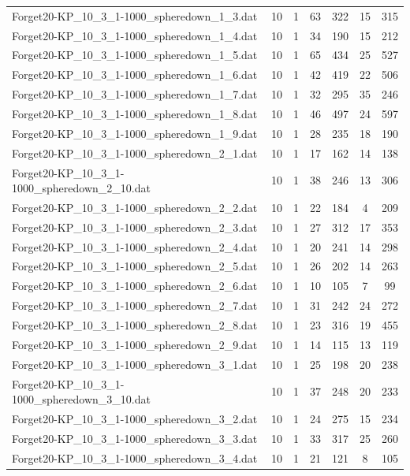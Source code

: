 \begin{table}[!ht]
\begin{tabular}{lcccccc}
Forget20-KP\_10\_3\_1-1000\_spheredown\_1\_3.dat & 10 & 1 & 63 & 322 & 15 & 315 \\
Forget20-KP\_10\_3\_1-1000\_spheredown\_1\_4.dat & 10 & 1 & 34 & 190 & 15 & 212 \\
Forget20-KP\_10\_3\_1-1000\_spheredown\_1\_5.dat & 10 & 1 & 65 & 434 & 25 & 527 \\
Forget20-KP\_10\_3\_1-1000\_spheredown\_1\_6.dat & 10 & 1 & 42 & 419 & 22 & 506 \\
Forget20-KP\_10\_3\_1-1000\_spheredown\_1\_7.dat & 10 & 1 & 32 & 295 & 35 & 246 \\
Forget20-KP\_10\_3\_1-1000\_spheredown\_1\_8.dat & 10 & 1 & 46 & 497 & 24 & 597 \\
Forget20-KP\_10\_3\_1-1000\_spheredown\_1\_9.dat & 10 & 1 & 28 & 235 & 18 & 190 \\
Forget20-KP\_10\_3\_1-1000\_spheredown\_2\_1.dat & 10 & 1 & 17 & 162 & 14 & 138 \\
Forget20-KP\_10\_3\_1-1000\_spheredown\_2\_10.dat & 10 & 1 & 38 & 246 & 13 & 306 \\
Forget20-KP\_10\_3\_1-1000\_spheredown\_2\_2.dat & 10 & 1 & 22 & 184 & 4 & 209 \\
Forget20-KP\_10\_3\_1-1000\_spheredown\_2\_3.dat & 10 & 1 & 27 & 312 & 17 & 353 \\
Forget20-KP\_10\_3\_1-1000\_spheredown\_2\_4.dat & 10 & 1 & 20 & 241 & 14 & 298 \\
Forget20-KP\_10\_3\_1-1000\_spheredown\_2\_5.dat & 10 & 1 & 26 & 202 & 14 & 263 \\
Forget20-KP\_10\_3\_1-1000\_spheredown\_2\_6.dat & 10 & 1 & 10 & 105 & 7 & 99 \\
Forget20-KP\_10\_3\_1-1000\_spheredown\_2\_7.dat & 10 & 1 & 31 & 242 & 24 & 272 \\
Forget20-KP\_10\_3\_1-1000\_spheredown\_2\_8.dat & 10 & 1 & 23 & 316 & 19 & 455 \\
Forget20-KP\_10\_3\_1-1000\_spheredown\_2\_9.dat & 10 & 1 & 14 & 115 & 13 & 119 \\
Forget20-KP\_10\_3\_1-1000\_spheredown\_3\_1.dat & 10 & 1 & 25 & 198 & 20 & 238 \\
Forget20-KP\_10\_3\_1-1000\_spheredown\_3\_10.dat & 10 & 1 & 37 & 248 & 20 & 233 \\
Forget20-KP\_10\_3\_1-1000\_spheredown\_3\_2.dat & 10 & 1 & 24 & 275 & 15 & 234 \\
Forget20-KP\_10\_3\_1-1000\_spheredown\_3\_3.dat & 10 & 1 & 33 & 317 & 25 & 260 \\
Forget20-KP\_10\_3\_1-1000\_spheredown\_3\_4.dat & 10 & 1 & 21 & 121 & 8 & 105 \\

\end{tabular}
\end{table}
